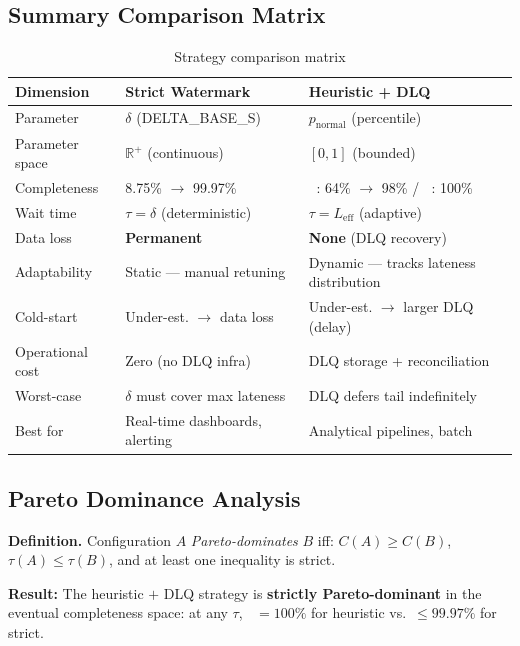 \documentclass[11pt,a4paper]{article}
\DeclareMathOperator{\Cimm}{C_{\text{imm}}}
\DeclareMathOperator{\Cev}{C_{\text{ev}}}
\newcommand{\Leff}{L_{\text{eff}}}
\begin{document}
\subsection{Summary Comparison Matrix}

\begin{table}[H]
\centering
\caption{Strategy comparison matrix}
\label{tab:comparison}
\begin{tabular}{p{3.8cm}p{4.2cm}p{4.2cm}}
\toprule
\textbf{Dimension} & \textbf{Strict Watermark} & \textbf{Heuristic + DLQ} \\
\midrule
Parameter     & $\delta$ (DELTA\_BASE\_S)     & $p_{\text{normal}}$ (percentile) \\
Parameter space & $\mathbb{R}^+$ (continuous)   & $[0, 1]$ (bounded) \\
Completeness  & 8.75\% $\to$ 99.97\%          & $\Cimm$: 64\% $\to$ 98\% / $\Cev$: 100\% \\
Wait time     & $\tau = \delta$ (deterministic) & $\tau = \Leff$ (adaptive) \\
Data loss     & \textbf{Permanent}             & \textbf{None} (DLQ recovery) \\
Adaptability  & Static --- manual retuning    & Dynamic --- tracks lateness distribution \\
Cold-start    & Under-est. $\to$ data loss    & Under-est. $\to$ larger DLQ (delay) \\
Operational cost & Zero (no DLQ infra)        & DLQ storage + reconciliation \\
Worst-case    & $\delta$ must cover max lateness & DLQ defers tail indefinitely \\
Best for      & Real-time dashboards, alerting & Analytical pipelines, batch \\
\bottomrule
\end{tabular}
\end{table}

\subsection{Pareto Dominance Analysis}

\textbf{Definition.} Configuration $A$ \textit{Pareto-dominates} $B$ iff:
$C(A) \geq C(B)$, $\tau(A) \leq \tau(B)$, and at least one inequality is strict.

\textbf{Result:} The heuristic $+$ DLQ strategy is \textbf{strictly Pareto-dominant} in the eventual completeness space:
at any $\tau$, $\Cev = 100\%$ for heuristic vs.\ $\leq 99.97\%$ for strict.
\end{document}
